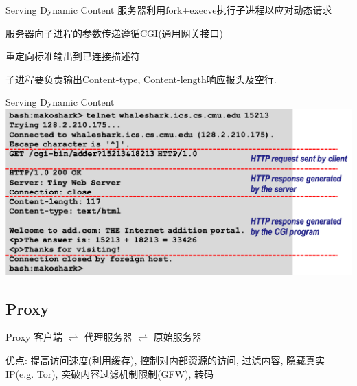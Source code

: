 \documentclass[]{beamer}
\begin{document}
\begin{frame}{Serving Dynamic Content}
	服务器利用fork+execve执行子进程以应对动态请求
	
	服务器向子进程的参数传递遵循CGI(通用网关接口)
	
	重定向标准输出到已连接描述符
	
	\begin{alertenv}
		子进程要负责输出Content-type, Content-length响应报头及空行.
	\end{alertenv}
	
\end{frame}

\begin{frame}{Serving Dynamic Content}
	\includegraphics[width=\linewidth]{figures/dynamic}
\end{frame}

\subsection{Proxy}
\begin{frame}{Proxy}
	客户端 $\rightleftharpoons$ 代理服务器 $\rightleftharpoons$ 原始服务器
	
	优点: 提高访问速度(利用缓存), 控制对内部资源的访问, 过滤内容, 隐藏真实IP(e.g. Tor), 突破内容过滤机制限制(GFW), 转码
	
	

\end{frame}
\end{document}
